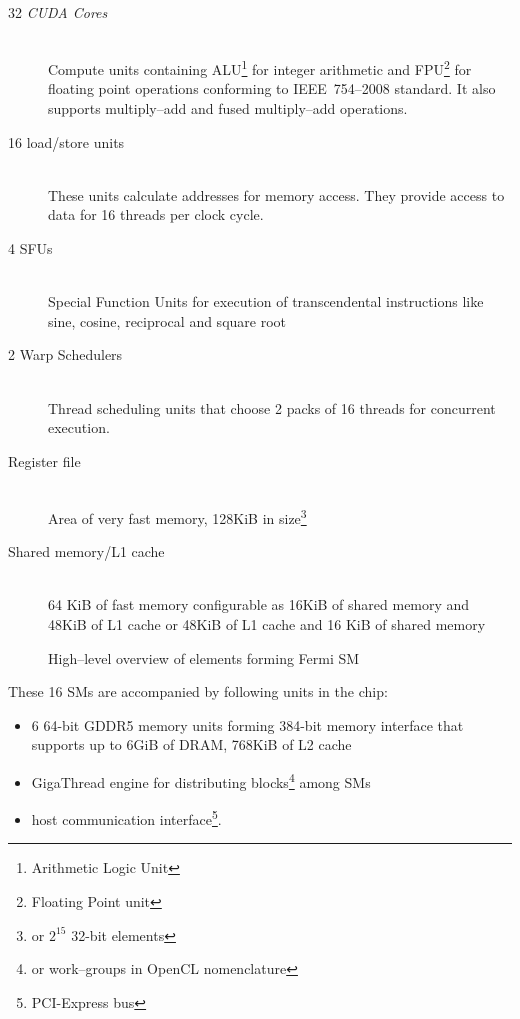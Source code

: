 \begin{description}
  \item[32 \emph{CUDA Cores}] \hfill \\
    Compute units containing ALU\footnote{Arithmetic Logic Unit}
    for integer arithmetic and FPU\footnote{Floating Point unit} for floating point
    operations conforming to IEEE~754--2008 standard. It also supports multiply--add
    and fused multiply--add operations.
  \item[16 load/store units] \hfill \\
    These units calculate addresses for memory access. They provide access to
    data for 16 threads per clock cycle.
  \item[4 SFUs] \hfill \\
    Special Function Units for execution of transcendental instructions
    like sine, cosine, reciprocal and square root
  \item[2 Warp Schedulers] \hfill \\
    Thread scheduling units that choose 2 packs of 16 threads for concurrent
    execution.
  \item[Register file] \hfill \\
    Area of very fast memory, 128KiB in size\footnote{or $2^{15}$ 32-bit elements}
  \item[Shared memory/L1 cache] \hfill \\
    64 KiB of fast memory configurable as
    16KiB of shared memory and 48KiB of L1 cache or 48KiB of L1 cache and 16 KiB
    of shared memory
\end{description}
\begin{figure}[pb]
  \begin{center}
      
  \end{center}
  \caption{High--level overview of elements forming Fermi SM}
  \label{fig:fermism}
\end{figure}

These 16 SMs are accompanied by following units in the chip:
\begin{itemize}
  \item 6 64-bit GDDR5 memory units forming 384-bit
memory interface that supports up to 6GiB of DRAM, 768KiB of L2 cache
  \item GigaThread engine for distributing blocks\footnote{or work--groups in OpenCL nomenclature}
  among SMs
  \item host communication interface\footnote{PCI-Express bus}.
\end{itemize}

